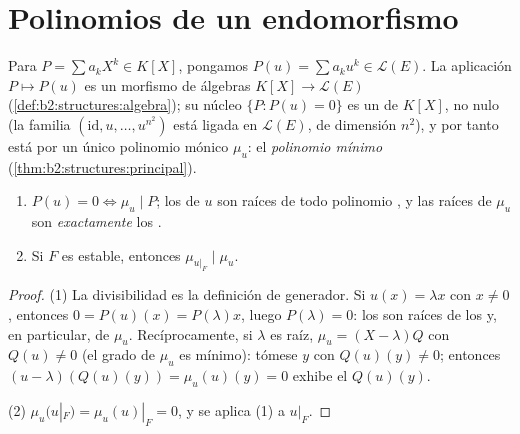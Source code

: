 \section{Polinomios de un endomorfismo}

\begin{definition}\label{def:b2:reduction:polyu}
Para $P = \sum a_k X^k \in K[X]$, pongamos $P(u) = \sum a_k u^k \in
\mathcal{L}(E)$. La aplicación $P \mapsto P(u)$ es un morfismo de
álgebras $K[X] \to \mathcal{L}(E)$
(\cref{def:b2:structures:algebra}); su núcleo $\{P : P(u) = 0\}$ es
un  de $K[X]$, no nulo (la familia $(\mathrm{id}, u, \dots,
u^{n^2})$ está ligada en $\mathcal{L}(E)$, de dimensión $n^2$), y por
tanto está  por un único polinomio mónico $\mu_u$: el
\emph{polinomio mínimo}
(\cref{thm:b2:structures:principal}).
\end{definition}

\begin{proposition}\label{prop:b2:reduction:minpoly}
\begin{enumerate}
  \item $P(u) = 0 \iff \mu_u \mid P$; los  de $u$ son
        raíces de todo polinomio , y las raíces de $\mu_u$
        son \emph{exactamente} los .
  \item Si $F$ es estable, entonces $\mu_{u|_F} \mid \mu_u$.
\end{enumerate}
\end{proposition}

\begin{proof}
(1) La divisibilidad es la definición de generador. Si $u(x) =
\lambda x$ con $x \neq 0$, entonces $0 = P(u)(x) = P(\lambda)x$,
luego $P(\lambda) = 0$: los  son raíces de los
 y, en particular, de $\mu_u$. Recíprocamente, si
$\lambda$ es raíz, $\mu_u = (X - \lambda)Q$ con $Q(u) \neq 0$ (el
grado de $\mu_u$ es mínimo): tómese $y$ con $Q(u)(y) \neq 0$;
entonces $(u - \lambda)(Q(u)(y)) = \mu_u(u)(y) = 0$ exhibe el
 $Q(u)(y)$.

(2) $\mu_u(u|_F) = \mu_u(u)|_F = 0$, y se aplica (1) a $u|_F$.
\end{proof}

